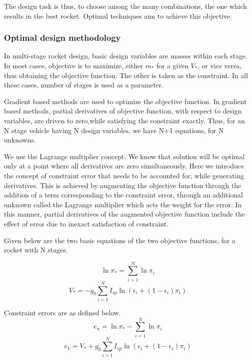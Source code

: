\documentclass{article}
\theoremstyle{definition}
\begin{document}
The design task is thus, to choose among the many combinations, the one which results in the best rocket. Optimal techniques aim to achieve this objective.

\subsubsection{Optimal design methodology}

In multi-stage rocket design, basic design variables are masses within each stage.
In most cases, objective is to maximize, either $m_*$ for a given $V_*$, or vice versa, thus obtaining the objective function. 
The other is taken as the constraint.
In all these cases, number of stages is used as a parameter.

Gradient based methods are used to optimize the objective function.
In gradient based methods, partial derivatives of objective function, with respect to design variables, are driven to zero,while satisfying the constraint exactly.
Thus, for an N stage vehicle having N design variables, we have N+1 equations, for N unknowns. \medskip

We use the Lagrange multiplier concept. 
We know that solution will be optimal only at a point where all derivatives are zero simultaneously.
Here we introduce the concept of constraint error that needs to be accounted for, while generating derivatives. 
This is achieved by augmenting the objective function through the addition of a term corresponding to the constraint error, through an additional unknown called the Lagrange multiplier which acts the weight for the error.
In this manner, partial derivatives of the augmented objective function include the effect of error due to inexact satisfaction of constraint. \medskip


Given below are the two basic equations of the two objective functions, for a rocket with N stages.

\begin{equation}
    \ln{\pi_*} = \sum_{i=1}^N \ln{\pi_i}
\end{equation}
\begin{equation}
    V_* = - g_0 \sum_{i=1}^N I_{sp} \ln{(\epsilon_i + (1 - \epsilon_i)\pi_i)}
\end{equation}

Constraint errors are as defined below. 
\begin{equation}
    e_\pi = \ln{\pi_*} - \sum_{i=1}^N \ln{\pi_i}
\end{equation}
\begin{equation}
    e_V = V_* + g_0 \sum_{i=1}^N I_{sp} \ln{(\epsilon_i + (1 - \epsilon_i)\pi_i)}
\end{equation}
\end{document}
